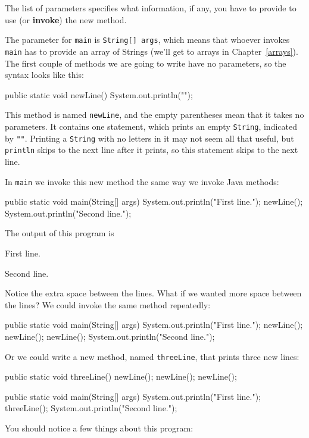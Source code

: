 The list of parameters specifies what information, if any, you have to
provide to use (or {\bf invoke}) the new method.

The parameter for {\tt main} is {\tt String[] args}, which
means that whoever invokes {\tt main} has to provide an array of
Strings (we'll get to arrays in Chapter~\ref{arrays}).  The first
couple of methods we are going to write have no parameters, so the
syntax looks like this:

\begin{code}
  public static void newLine() {
    System.out.println("");
  }
\end{code}
%
This method is named {\tt newLine}, and the empty parentheses
mean that it takes no parameters.  It contains one
statement, which prints an empty {\tt String}, indicated by {\tt ""}.
Printing a {\tt String} with no letters in it may not seem all that
useful, but {\tt println} skips to the next
line after it prints, so this statement skips to the next line.

In {\tt main} we invoke this new method the same way we invoke
Java methods:

\begin{code}
  public static void main(String[] args) {
    System.out.println("First line.");
    newLine();
    System.out.println("Second line.");
  }
\end{code}
%
The output of this program is

\begin{minipage}{\linewidth}
\begin{stdout}
First line.

Second line.
\end{stdout}
\end{minipage}

Notice the extra space between the lines.  What if we wanted
more space between the lines?  We could invoke the same
method repeatedly:

\begin{code}
  public static void main(String[] args) {
    System.out.println("First line.");
    newLine();
    newLine();
    newLine();
    System.out.println("Second line.");
  }
\end{code}
%
Or we could write a new method, named {\tt threeLine}, that
prints three new lines:

\begin{code}
  public static void threeLine() {
    newLine();  newLine();  newLine();
  }

  public static void main(String[] args) {
    System.out.println("First line.");
    threeLine();
    System.out.println("Second line.");
  }
\end{code}
%
You should notice a few things about this program:

